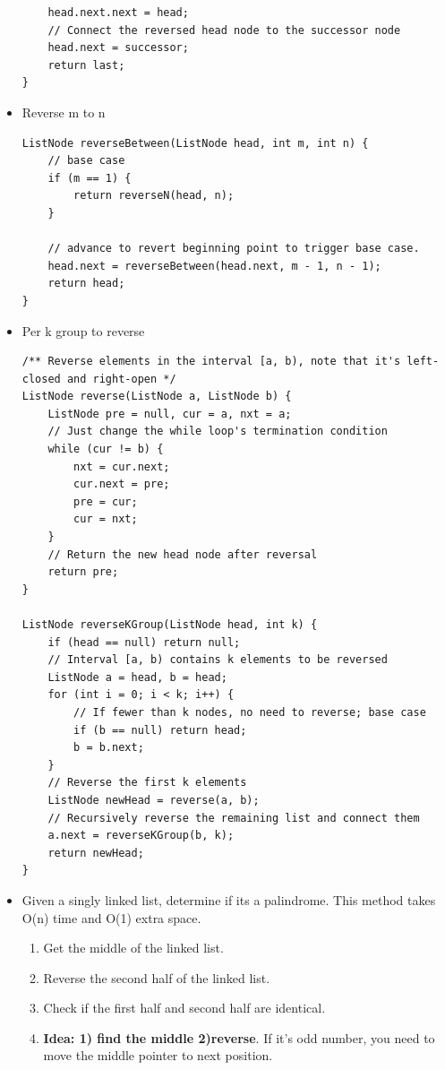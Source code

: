 \documentclass[a4paper,11pt,twoside]{book}
\begin{document}
\begin{itemize}
\begin{lstlisting}
	head.next.next = head;
	// Connect the reversed head node to the successor node
	head.next = successor;
	return last;
}
\end{lstlisting}

\item Reverse m to n 
\begin{lstlisting}
ListNode reverseBetween(ListNode head, int m, int n) {
	// base case
	if (m == 1) {
		return reverseN(head, n);
	}
	
	// advance to revert beginning point to trigger base case.
	head.next = reverseBetween(head.next, m - 1, n - 1);
	return head;
}
\end{lstlisting}


\item Per k group to reverse 
\begin{lstlisting}
/** Reverse elements in the interval [a, b), note that it's left-closed and right-open */
ListNode reverse(ListNode a, ListNode b) {
	ListNode pre = null, cur = a, nxt = a;
	// Just change the while loop's termination condition
	while (cur != b) {
		nxt = cur.next;
		cur.next = pre;
		pre = cur;
		cur = nxt;
	}
	// Return the new head node after reversal
	return pre;
}

ListNode reverseKGroup(ListNode head, int k) {
	if (head == null) return null;
	// Interval [a, b) contains k elements to be reversed
	ListNode a = head, b = head;
	for (int i = 0; i < k; i++) {
		// If fewer than k nodes, no need to reverse; base case
		if (b == null) return head;
		b = b.next;
	}
	// Reverse the first k elements
	ListNode newHead = reverse(a, b);
	// Recursively reverse the remaining list and connect them
	a.next = reverseKGroup(b, k);
	return newHead;
}
\end{lstlisting}

	\item Given a singly linked list, determine if its a palindrome. This method takes O(n) time and O(1) extra space.
\begin{enumerate}
	\item Get the middle of the linked list.
	\item Reverse the second half of the linked list.
	\item Check if the first half and second half are identical.
	\item \textbf{Idea: 1) find the middle 2)reverse}. If it's odd number,  you need to move the middle pointer to next position.
\end{enumerate}



\end{itemize}
\end{document}
